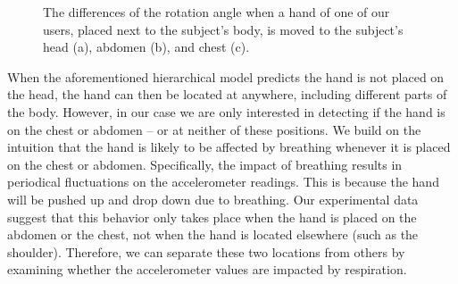 \begin{figure}[!t]
	\centering
	\caption{The differences of the rotation angle when a hand of one of our users, placed next to the subject's body, is moved to the subject's head (a), abdomen (b), and chest (c). }\label{Bodyhand}
\end{figure}



 {When the aforementioned hierarchical model predicts the hand is not placed on the head, the
hand can then be located at anywhere, including different parts of the body. {However, in our case we are only interested in detecting if
the hand is on the chest or abdomen -- or at neither of these positions.} We build on the intuition that the hand is likely to be affected
by breathing whenever it is placed on the chest or abdomen.} Specifically, the impact of breathing results in periodical fluctuations on
the accelerometer readings. This is because the hand will be pushed up and drop down due to breathing.  {Our experimental data suggest that
this behavior only takes place when the hand is placed on the abdomen or the chest, not when the hand is located elsewhere (such as the
shoulder). Therefore, we can separate these two locations from others by examining whether the accelerometer values are impacted by
respiration.}

